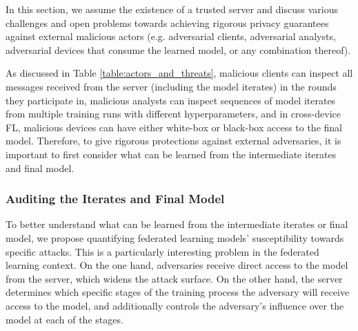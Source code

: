 In this section, we assume the existence of a trusted server and discuss various challenges and open problems towards achieving rigorous privacy guarantees against external malicious actors (e.g. adversarial clients, adversarial analysts, adversarial devices that consume the learned model, or any combination thereof). 

As discussed in Table \ref{table:actors_and_threats}, malicious clients can inspect all messages received from the server (including the model iterates) in the rounds they participate in,  malicious analysts  can inspect sequences of model iterates from multiple training runs with different hyperparameters, and in cross-device FL, malicious devices can have either white-box or black-box access to the final model. Therefore, to give rigorous protections against external adversaries, it is important to first consider what can be learned from the intermediate iterates and final model. 

\subsubsection{Auditing the Iterates and Final Model}
\label{sssec:auditing}

To better understand what can be learned from the intermediate iterates or final model, we  propose quantifying federated learning models' susceptibility towards specific attacks.
This is a particularly interesting problem in the federated learning context. On the one hand, adversaries receive direct access to the model from the server, which widens the attack surface.
On the other hand, the server determines which specific stages of the training process the adversary will receive access to the model, and additionally controls the adversary's influence over the model at each of the stages.
 
